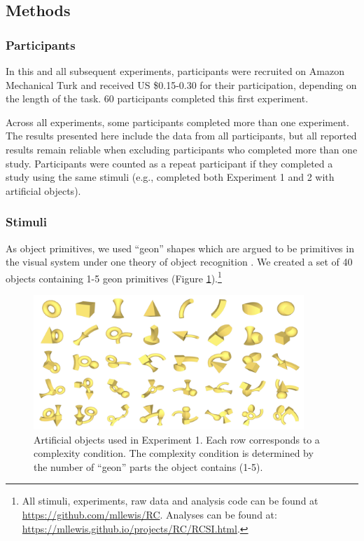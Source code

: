 \documentclass[man]{apa2}
\begin{document}
\subsection{Methods}

\subsubsection{Participants} In this and all subsequent experiments, participants were recruited on Amazon Mechanical Turk and received US \$0.15-0.30 for their participation, depending on the length of the task. 60 participants completed this first experiment.

Across all experiments, some participants completed more than one experiment. The results presented here include the data from all participants, but all reported results remain reliable when excluding participants who completed more than one study. Participants were counted as a repeat participant if they completed a study using the same stimuli (e.g., completed both Experiment 1 and 2 with artificial objects).

\subsubsection{Stimuli}
As object primitives, we used ``geon'' shapes which are argued to be primitives in the visual system under one theory of object recognition \cite{biederman1987}. We created a set of 40 objects containing 1-5 geon primitives (Figure \ref{fig:geons}).\footnote{All stimuli, experiments, raw data and analysis code can be found at \url{https://github.com/mllewis/RC}.
Analyses can be found at: \url{https://mllewis.github.io/projects/RC/RCSI.html}.}

\begin{figure}
 \begin{center}
  \includegraphics[height=2in]{figures/geon_stimuli.png}
  \caption{\label{fig:geons} Artificial objects used in Experiment 1. Each row corresponds to a complexity condition. The complexity condition is determined by the number of ``geon'' parts the object contains (1-5). }
 \end{center}
\end{figure}
\end{document}
